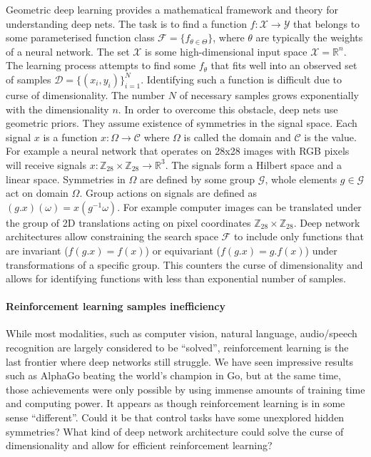 \documentclass[12pt]{article}
\begin{document}
Geometric deep learning provides a mathematical framework and theory for understanding deep nets. The task is to find a function $f:\mathcal{X}\rightarrow\mathcal{Y}$ that belongs to some parameterised function class $\mathcal{F}=\{f_{\theta \in \Theta}\}$, where $\theta$ are typically the weights of a neural network. The set $\mathcal{X}$ is some high-dimensional input space $\mathcal{X}=\mathbb{R}^n$. The learning process attempts to find some $f_\theta$ that fits well into an observed set of samples $\mathcal{D}=\{(x_i,y_i)\}_{i=1}^N$. Identifying such a function is difficult due to curse of dimensionality. The number $N$ of necessary samples grows exponentially with the dimensionality $n$. In order to overcome this obstacle, deep nets use geometric priors. They assume existence of symmetries in the signal space. Each signal $x$ is a function $x:\Omega \rightarrow \mathcal{C}$ where $\Omega$ is called the domain and $\mathcal{C}$ is the value.
For example a neural network that operates on 28x28 images with RGB pixels will receive signals $x:\mathbb{Z}_{28}\times \mathbb{Z}_{28} \rightarrow \mathbb{R}^{3}$. The signals form a Hilbert space and a linear space. Symmetries in $\Omega$ are defined by some group $\mathcal{G}$, whole elements $g\in \mathcal{G}$ act on domain $\Omega$. Group actions on signals are defined as $(g.x)(\omega)=x(g^{-1}\omega)$. For example computer images can be translated under the group of 2D translations acting on pixel coordinates $\mathbb{Z}_{28}\times \mathbb{Z}_{28}$. Deep network architectures allow constraining the search space $\mathcal{F}$ to include only functions that are invariant ($f(g.x)=f(x)$) or equivariant ($f(g.x)=g.f(x)$) under transformations of a specific group. This counters the curse of dimensionality and allows for identifying functions with less than exponential number of samples.

\paragraph{Reinforcement learning samples inefficiency}
While most modalities, such as computer vision, natural language, audio/speech recognition are largely considered to be ``solved'', reinforcement learning is the last frontier where deep networks still struggle. We have seen impressive results such as AlphaGo beating the world's champion in Go, but at the same time, those achievements were only possible by using immense amounts of training time and computing power. It appears as though reinforcement learning is in some sense ``different''. Could it be that control tasks have some unexplored hidden symmetries? What kind of deep network architecture could solve the curse of dimensionality and allow for efficient reinforcement learning?
\end{document}
